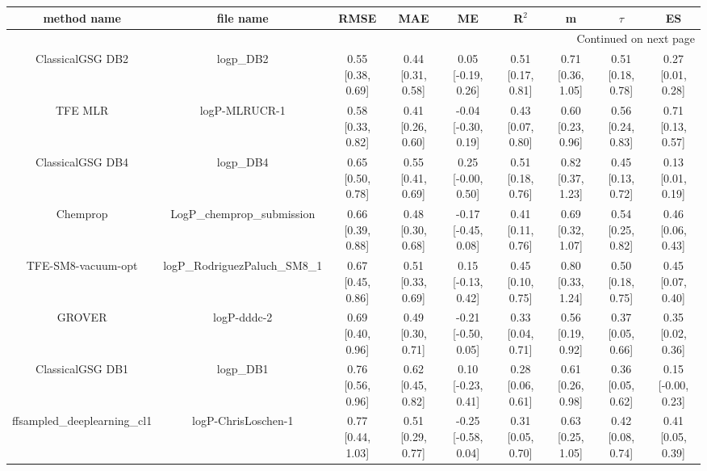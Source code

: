 \documentclass{article}
\begin{document}
\begin{center}
\scriptsize
\begin{longtable}{|ccccccccc|}
\toprule
                  method name &                                      file name &               RMSE &                MAE &                    ME &              R$^2$ &                     m &                $\tau$ &                    ES \\
\midrule
\endhead
\midrule
\multicolumn{9}{r}{{Continued on next page}} \\
\midrule
\endfoot

\bottomrule
\endlastfoot
             ClassicalGSG DB2 &                                      logp\_DB2 &  0.55 [0.38, 0.69] &  0.44 [0.31, 0.58] &    0.05 [-0.19, 0.26] &  0.51 [0.17, 0.81] &     0.71 [0.36, 1.05] &     0.51 [0.18, 0.78] &     0.27 [0.01, 0.28] \\
                      TFE MLR &                                  logP-MLRUCR-1 &  0.58 [0.33, 0.82] &  0.41 [0.26, 0.60] &   -0.04 [-0.30, 0.19] &  0.43 [0.07, 0.80] &     0.60 [0.23, 0.96] &     0.56 [0.24, 0.83] &     0.71 [0.13, 0.57] \\
             ClassicalGSG DB4 &                                      logp\_DB4 &  0.65 [0.50, 0.78] &  0.55 [0.41, 0.69] &    0.25 [-0.00, 0.50] &  0.51 [0.18, 0.76] &     0.82 [0.37, 1.23] &     0.45 [0.13, 0.72] &     0.13 [0.01, 0.19] \\
                     Chemprop &                     LogP\_chemprop\_submission &  0.66 [0.39, 0.88] &  0.48 [0.30, 0.68] &   -0.17 [-0.45, 0.08] &  0.41 [0.11, 0.76] &     0.69 [0.32, 1.07] &     0.54 [0.25, 0.82] &     0.46 [0.06, 0.43] \\
           TFE-SM8-vacuum-opt &                  logP\_RodriguezPaluch\_SM8\_1 &  0.67 [0.45, 0.86] &  0.51 [0.33, 0.69] &    0.15 [-0.13, 0.42] &  0.45 [0.10, 0.75] &     0.80 [0.33, 1.24] &     0.50 [0.18, 0.75] &     0.45 [0.07, 0.40] \\
                       GROVER &                                    logP-dddc-2 &  0.69 [0.40, 0.96] &  0.49 [0.30, 0.71] &   -0.21 [-0.50, 0.05] &  0.33 [0.04, 0.71] &     0.56 [0.19, 0.92] &     0.37 [0.05, 0.66] &     0.35 [0.02, 0.36] \\
             ClassicalGSG DB1 &                                      logp\_DB1 &  0.76 [0.56, 0.96] &  0.62 [0.45, 0.82] &    0.10 [-0.23, 0.41] &  0.28 [0.06, 0.61] &     0.61 [0.26, 0.98] &     0.36 [0.05, 0.62] &    0.15 [-0.00, 0.23] \\
   ffsampled_deeplearning_cl1 &                            logP-ChrisLoschen-1 &  0.77 [0.44, 1.03] &  0.51 [0.29, 0.77] &   -0.25 [-0.58, 0.04] &  0.31 [0.05, 0.70] &     0.63 [0.25, 1.05] &     0.42 [0.08, 0.74] &     0.41 [0.05, 0.39] \\

\end{longtable}
\end{center}
\end{document}
